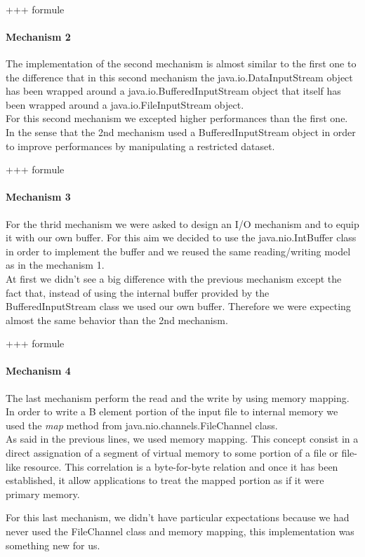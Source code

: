 \documentclass[14pt]{report}
\begin{document}
\\
+++ formule 
\paragraph{Mechanism 2}  The implementation of the second mechanism is almost similar to the first one to the difference that in this second mechanism the java.io.DataInputStream object has been wrapped around a java.io.BufferedInputStream object that itself has been wrapped around a java.io.FileInputStream object.
\\
For this second mechanism we excepted higher performances than the first one. In the sense that the 2nd mechanism used a BufferedInputStream object in order to improve performances by manipulating a restricted dataset. 


+++ formule  
\paragraph{Mechanism 3} 
For the thrid mechanism we were asked to design an I/O mechanism and to equip it with our own buffer. For this aim we decided to use the java.nio.IntBuffer class in order to implement the buffer and we reused the same reading/writing model as in the mechanism 1. 
\\
At first we didn't see a big difference with the previous mechanism except the fact that, instead of using the internal buffer provided by the BufferedInputStream class we used our own buffer. Therefore we were expecting almost the same behavior than the 2nd mechanism.



+++ formule  
\paragraph{Mechanism 4}  The last mechanism perform the read and the write by using memory mapping. In order to write a B element portion of the input file to internal memory we used the \textit{map} method from java.nio.channels.FileChannel class.\\

As said in the previous lines, we used memory mapping. This concept consist in a direct assignation of a segment of virtual memory to some portion of a file or file-like resource. This correlation is a byte-for-byte relation and once it has been established, it allow applications to treat the mapped portion as if it were primary memory. 

For this last mechanism, we didn't have particular expectations because we had never used the FileChannel class and memory mapping, this implementation was something new for us.
\end{document}
